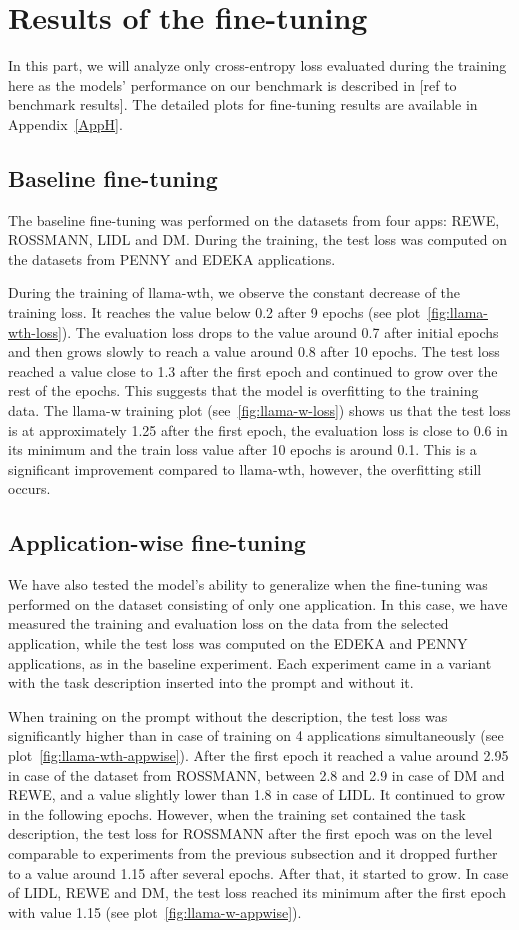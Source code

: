 \documentclass[licencjacka,en]{pracamgr}
\begin{document}
\section{Results of the fine-tuning}
In this part, we will analyze only cross-entropy loss evaluated during the training here as the models' performance on our benchmark is described in [ref to benchmark results]. The detailed plots for fine-tuning results are available in Appendix~\ref{AppH}.
\subsection{Baseline fine-tuning}
The baseline fine-tuning was performed on the datasets from four apps: REWE, ROSSMANN, LIDL and DM. During the training, the test loss was computed on the datasets from PENNY and EDEKA applications.

During the training of llama-wth, we observe the constant decrease of the training loss. It reaches the value below 0.2 after 9 epochs (see plot~\ref{fig:llama-wth-loss}). The evaluation loss drops to the value around 0.7 after initial epochs and then grows slowly to reach a value around 0.8 after 10 epochs. The test loss reached a value close to 1.3 after the first epoch and continued to grow over the rest of the epochs. This suggests that the model is overfitting to the training data.
The llama-w training plot (see~\ref{fig:llama-w-loss}) shows us that the test loss is at approximately 1.25 after the first epoch, the evaluation loss is close to 0.6 in its minimum and the train loss value after 10 epochs is around 0.1. This is a significant improvement compared to llama-wth, however, the overfitting still occurs.

\subsection{Application-wise fine-tuning}
We have also tested the model's ability to generalize when the fine-tuning was performed on the dataset consisting of only one application. In this case, we have measured the training and evaluation loss on the data from the selected application, while the test loss was computed on the EDEKA and PENNY applications, as in the baseline experiment. Each experiment came in a variant with the task description inserted into the prompt and without it.

When training on the prompt without the description, the test loss was significantly higher than in case of training on 4 applications simultaneously (see plot~\ref{fig:llama-wth-appwise}). After the first epoch it reached a value around 2.95 in case of the dataset from ROSSMANN, between 2.8 and 2.9 in case of DM and REWE, and a value slightly lower than 1.8 in case of LIDL. It continued to grow in the following epochs.
However, when the training set contained the task description, the test loss for ROSSMANN after the first epoch was on the level comparable to experiments from the previous subsection and it dropped further to a value around 1.15 after several epochs. After that, it started to grow. In case of LIDL, REWE and DM, the test loss reached its minimum after the first epoch with value 1.15 (see plot~\ref{fig:llama-w-appwise}).
\end{document}
